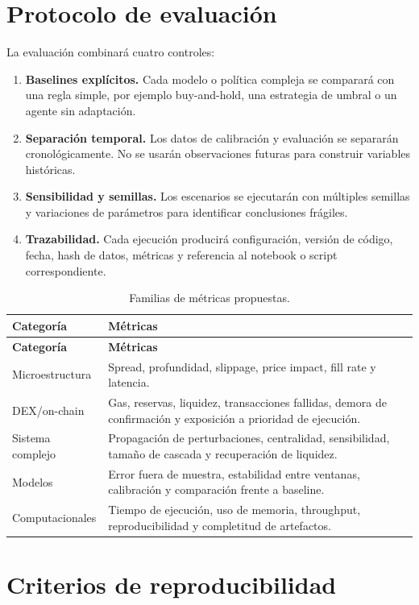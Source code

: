 \section{Protocolo de evaluación}

La evaluación combinará cuatro controles:

\begin{enumerate}
  \item \textbf{Baselines explícitos.} Cada modelo o política compleja se comparará con una regla simple, por ejemplo buy-and-hold, una estrategia de umbral o un agente sin adaptación.
  \item \textbf{Separación temporal.} Los datos de calibración y evaluación se separarán cronológicamente. No se usarán observaciones futuras para construir variables históricas.
  \item \textbf{Sensibilidad y semillas.} Los escenarios se ejecutarán con múltiples semillas y variaciones de parámetros para identificar conclusiones frágiles.
  \item \textbf{Trazabilidad.} Cada ejecución producirá configuración, versión de código, fecha, hash de datos, métricas y referencia al notebook o script correspondiente.
\end{enumerate}

\begin{longtable}{p{4.2cm}p{10.0cm}}
\caption{Familias de métricas propuestas.}\\
\toprule
\textbf{Categoría} & \textbf{Métricas} \\
\midrule
\endfirsthead
\toprule
\textbf{Categoría} & \textbf{Métricas} \\
\midrule
\endhead
Microestructura & Spread, profundidad, slippage, price impact, fill rate y latencia. \\
DEX/on-chain & Gas, reservas, liquidez, transacciones fallidas, demora de confirmación y exposición a prioridad de ejecución. \\
Sistema complejo & Propagación de perturbaciones, centralidad, sensibilidad, tamaño de cascada y recuperación de liquidez. \\
Modelos & Error fuera de muestra, estabilidad entre ventanas, calibración y comparación frente a baseline. \\
Computacionales & Tiempo de ejecución, uso de memoria, throughput, reproducibilidad y completitud de artefactos. \\
\bottomrule
\end{longtable}

\section{Criterios de reproducibilidad}

